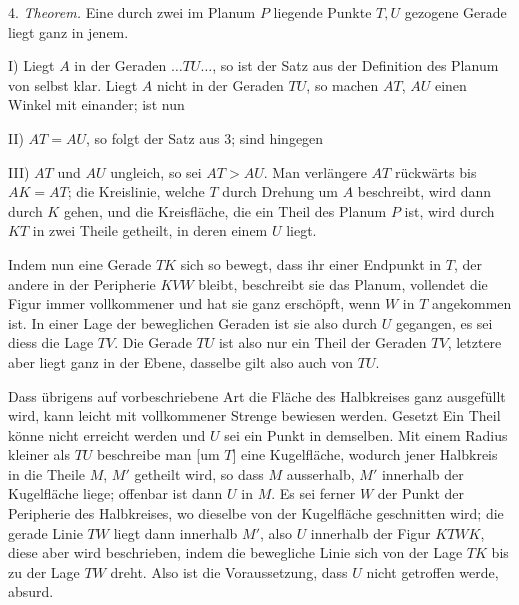 4. \emph{Theorem.} Eine durch zwei im Planum $P$ liegende Punkte $T, U$
gezogene Gerade liegt ganz in jenem.

 I) Liegt $A$ in der Geraden $\ldots TU \ldots$, so ist der Satz aus der
Definition des Planum von selbst klar. Liegt $A$ nicht in der Geraden $TU$, so
machen $AT$, $AU$ einen Winkel mit einander; ist nun

II) $AT = AU$, so folgt der Satz aus 3; sind hingegen

III) $AT$ und $AU$ ungleich, so sei $AT > AU$. Man verlängere $AT$ rückwärts
bis $AK = AT$; die Kreislinie, welche $T$ durch Drehung um $A$ beschreibt,
wird dann durch $K$ gehen, und die Kreisfläche, die ein Theil des Planum $P$
ist, wird durch $KT$ in zwei Theile getheilt, in deren einem $U$ liegt.

\begin{center}

\end{center}

Indem nun eine Gerade $TK$ sich so bewegt, dass ihr einer Endpunkt in $T$, der
andere in der Peripherie $KVW$ bleibt, beschreibt sie das Planum, vollendet
die Figur immer vollkommener und hat sie ganz erschöpft, wenn $W$ in $T$
angekommen ist. In einer Lage der beweglichen Geraden ist sie also durch $U$
gegangen, es sei diess die Lage $TV$. Die Gerade $TU$ ist also nur ein Theil
der Geraden $TV$, letztere aber liegt ganz in der Ebene, dasselbe gilt also
auch von $TU$.



Dass übrigens auf vorbeschriebene Art die Fläche des Halbkreises ganz
ausgefüllt wird, kann leicht mit vollkommener Strenge bewiesen werden.
Gesetzt Ein Theil könne nicht erreicht werden und $U$ sei ein Punkt in
demselben. Mit einem Radius kleiner als $TU$ beschreibe man [um $T$] eine
Kugelfläche, wodurch jener Halbkreis in die Theile $M$, $M'$ getheilt wird,
so dass $M$ ausserhalb, $M'$ innerhalb der Kugelfläche liege; offenbar ist
dann $U$ in $M$. Es sei ferner $W$ der Punkt der Peripherie des Halbkreises,
wo dieselbe von der Kugelfläche geschnitten wird; die gerade Linie $TW$ liegt
dann innerhalb $M'$, also $U$ innerhalb der Figur $KTWK$, diese aber wird
beschrieben, indem die bewegliche Linie sich von der Lage $TK$ bis zu der
Lage $TW$ dreht. Also ist die Voraussetzung, dass $U$ nicht getroffen werde,
absurd.

